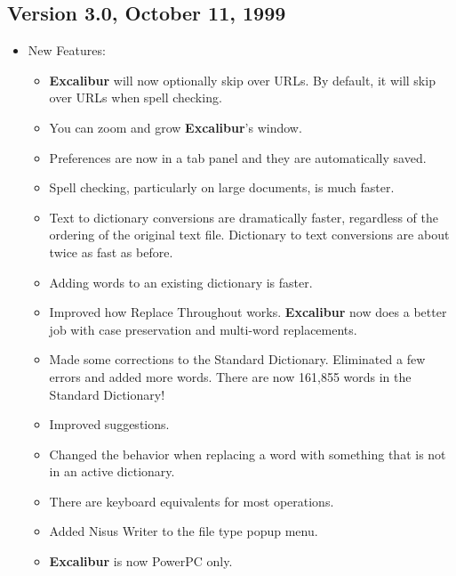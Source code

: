 ﻿\documentclass[11pt,titlepage]{article}
\newcommand{\ex}{\textbf{Excalibur}}
\begin{document}
\subsection{Version 3.0, October 11, 1999}

\begin{itemize}
\item New Features:

  \begin{itemize}

  \item \ex{} will now optionally skip over URLs.  By default, it will
    skip over URLs when spell checking.

  \item You can zoom and grow \ex's window.

  \item Preferences are now in a tab panel and they are automatically
    saved.

  \item Spell checking, particularly on large documents, is much
    faster.

  \item Text to dictionary conversions are dramatically faster,
    regardless of the ordering of the original text file.  Dictionary
    to text conversions are about twice as fast as before.

  \item Adding words to an existing dictionary is faster.

  \item Improved how Replace Throughout works.  \ex{} now does a
    better job with case preservation and multi-word replacements.

  \item Made some corrections to the Standard Dictionary.  Eliminated
    a few errors and added more words. There are now 161,855 words in
    the Standard Dictionary!

  \item Improved suggestions.

  \item Changed the behavior when replacing a word with something that
    is not in an active dictionary.

  \item There are keyboard equivalents for most operations.

  \item Added Nisus Writer to the file type popup menu.

  \item \ex{} is now PowerPC only.


\end{itemize}
\end{itemize}
\end{document}
